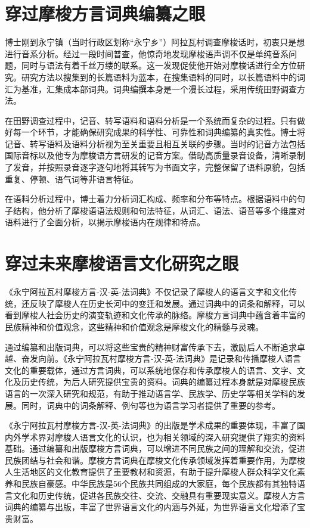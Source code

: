 \section*{穿过摩梭方言词典编纂之眼}

博士刚到永宁镇（当时行政区划称“永宁乡”）阿拉瓦村调查摩梭话时，初衷只是想进行音系分析。经过一段时间普查，他惊奇地发现摩梭语声调不仅是单纯音系问题，同时与语法有着千丝万缕的联系。这一发现促使他开始对摩梭话进行全方位研究。研究方法以搜集到的长篇语料为蓝本，在搜集语料的同时，以长篇语料中的词汇为基准，汇集成本部词典。词典编撰本身是一个漫长过程，采用传统田野调查方法。

在田野调查过程中，记音、转写语料和语料分析是一个系统而复杂的过程。只有做好每一个环节，才能确保研究成果的科学性、可靠性和词典编纂的真实性。博士将记音、转写语料及语料分析视为至关重要且相互关联的步骤。当时的记音方法包括国际音标以及他专为摩梭语方言研发的记音方案。借助高质量录音设备，清晰录制了发音，并按照录音逐字逐句地将其转写为书面文字，完整保留了语料原貌，包括重复、停顿、语气词等非语言特征。

在语料分析过程中，博士着力分析词汇构成、频率和分布等特点。根据语料中的句子结构，他分析了摩梭语语法规则和句法特征，从词汇、语法、语音等多个维度对语料进行了全面分析，以揭示摩梭语内在规律和特点。

\section*{穿过未来摩梭语言文化研究之眼}

《永宁阿拉瓦村摩梭方言-汉-英-法词典》不仅记录了摩梭人的语言文字和文化传统，还反映了摩梭人在历史长河中的变迁和发展。通过词典中的词条和解释，可以看到摩梭人社会历史的演变轨迹和文化传承的脉络。摩梭方言词典中蕴含着丰富的民族精神和价值观念，这些精神和价值观念是摩梭文化的精髓与灵魂。

通过编纂和出版词典，可以将这些宝贵的精神财富传承下去，激励后人不断追求卓越、奋发向前。《永宁阿拉瓦村摩梭方言-汉-英-法词典》是记录和传播摩梭人语言文化的重要载体，通过方言词典，可以系统地保存和传承摩梭人的语言、文字、文化及历史传统，为后人研究提供宝贵的资料。词典的编纂过程本身就是对摩梭民族语言的一次深入研究和规范，有助于推动语言学、民族学、历史学等相关学科的发展。同时，词典中的词条解释、例句等也为语言学习者提供了重要的参考。

《永宁阿拉瓦村摩梭方言-汉-英-法词典》的出版是学术成果的重要体现，丰富了国内外学术界对摩梭人语言文化的认识，也为相关领域的深入研究提供了翔实的资料基础。通过编纂和出版摩梭方言词典，可以增进不同民族之间的理解和交流，促进民族团结与社会和谐。摩梭方言词典在摩梭文化传承领域发挥着重要作用，为摩梭人生活地区的文化教育提供了重要教材和资源，有助于提升摩梭人群众科学文化素养和民族自豪感。中华民族是56个民族共同组成的大家庭，每个民族都有其独特语言文化和历史传统，促进各民族交往、交流、交融具有重要现实意义。摩梭人方言词典的编纂与出版，丰富了世界语言文化的内涵与外延，为世界语言文化增添了宝贵财富。

